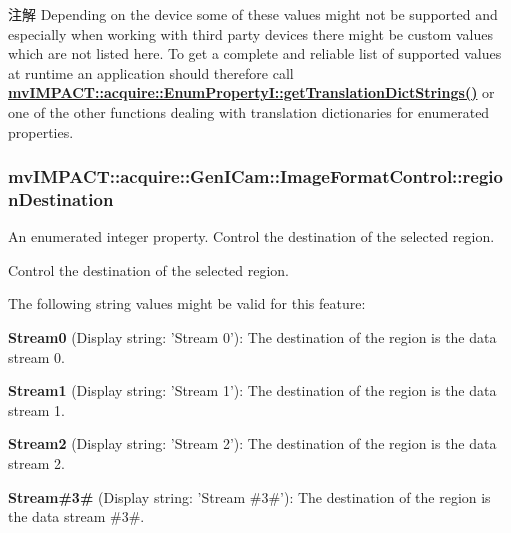\begin{DoxyNote}{注解}
Depending on the device some of these values might not be supported and especially when working with third party devices there might be custom values which are not listed here. To get a complete and reliable list of supported values at runtime an application should therefore call {\bfseries \hyperlink{classmv_i_m_p_a_c_t_1_1acquire_1_1_enum_property_i_a0ba6ccbf5ee69784d5d0b537924d26b6}{mv\+I\+M\+P\+A\+C\+T\+::acquire\+::\+Enum\+Property\+I\+::get\+Translation\+Dict\+Strings()}} or one of the other functions dealing with translation dictionaries for enumerated properties. 
\end{DoxyNote}
\hypertarget{classmv_i_m_p_a_c_t_1_1acquire_1_1_gen_i_cam_1_1_image_format_control_aa0cbc8a0b29c1406c45ef8b16bd92bdb}{
\subsubsection[{region\+Destination}]{ mv\+I\+M\+P\+A\+C\+T\+::acquire\+::\+Gen\+I\+Cam\+::\+Image\+Format\+Control\+::region\+Destination}}\label{classmv_i_m_p_a_c_t_1_1acquire_1_1_gen_i_cam_1_1_image_format_control_aa0cbc8a0b29c1406c45ef8b16bd92bdb}


An enumerated integer property. Control the destination of the selected region. 

Control the destination of the selected region.

The following string values might be valid for this feature\+:
\begin{DoxyItemize}
\item {\bfseries Stream0} (Display string\+: 'Stream 0')\+: The destination of the region is the data stream 0.
\item {\bfseries Stream1} (Display string\+: 'Stream 1')\+: The destination of the region is the data stream 1.
\item {\bfseries Stream2} (Display string\+: 'Stream 2')\+: The destination of the region is the data stream 2.
\item {\bfseries Stream\#3\#} (Display string\+: 'Stream \#3\#')\+: The destination of the region is the data stream \#3\#.
\end{DoxyItemize}

